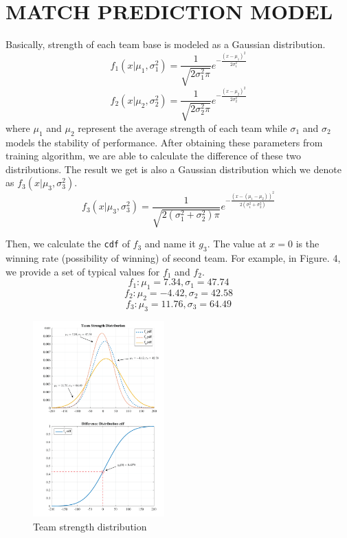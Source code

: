 \documentclass[letterpaper, 10 pt, conference]{ieeeconf}  %
\begin{document}
\section{MATCH PREDICTION MODEL}

Basically, strength of each team base is modeled as a Gaussian distribution. 
$$f_1(x|\mu_1, \sigma_1^2) = \frac{1}{\sqrt{2\sigma_1^2 \pi}} e^{-\frac{(x-\mu_1)^2}{2\sigma_1^2}} $$
$$f_2(x|\mu_2, \sigma_2^2) = \frac{1}{\sqrt{2\sigma_2^2 \pi}} e^{-\frac{(x-\mu_2)^2}{2\sigma_2^2}} $$
where $\mu_1$ and $\mu_2$ represent the average strength of each team while $\sigma_1$ and $\sigma_2$ models the stability of performance. After obtaining these parameters from training algorithm, we are able to calculate the difference of these two distributions. The result we get is also a Gaussian distribution which we denote as $f_3(x|\mu_3, \sigma_3^2)$.
$$f_3(x|\mu_3, \sigma_3^2) = \frac{1}{\sqrt{2(\sigma_1^2 + \sigma_2^2) \pi}} e^{-\frac{(x-(\mu_1-\mu_2))^2}{2(\sigma_1^2 + \sigma_2^2)}} $$

Then, we calculate the \texttt{cdf} of $f_3$ and name it $g_3$. The value at $x = 0$ is the winning rate (possibility of winning) of second team. For example, in Figure. 4, we provide a set of typical values for $f_1$ and $f_2$. 
$$f_1: \mu_1 = 7.34, \sigma_1 = 47.74$$
$$f_2: \mu_2 = -4.42, \sigma_2 = 42.58$$
$$f_3: \mu_3 = 11.76, \sigma_3 = 64.49$$
\begin{figure}[h]
\begin{center}
\includegraphics[width=0.45\textwidth]{distribution_ai.png}
\caption{Team strength distribution}
\end{center}
\end{figure}
\end{document}
